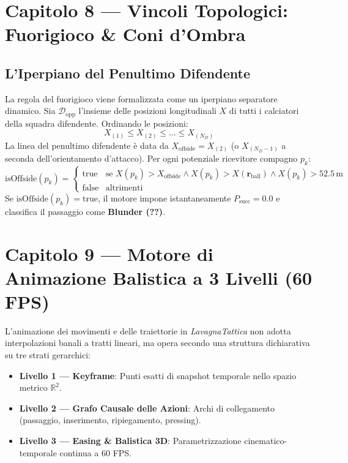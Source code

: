 \documentclass[11pt,a4paper]{article}
\begin{document}
\section{Capitolo 8 — Vincoli Topologici: Fuorigioco \& Coni d'Ombra}

\subsection{L'Iperpiano del Penultimo Difendente}
La regola del fuorigioco viene formalizzata come un iperpiano separatore dinamico. Sia $\mathcal{D}_{\text{opp}}$ l'insieme delle posizioni longitudinali $X$ di tutti i calciatori della squadra difendente. Ordinando le posizioni:
\begin{equation}
X_{(1)} \le X_{(2)} \le \dots \le X_{(N_D)}
\end{equation}
La linea del penultimo difendente è data da $X_{\text{offside}} = X_{(2)}$ (o $X_{(N_D - 1)}$ a seconda dell'orientamento d'attacco).
Per ogni potenziale ricevitore compagno $p_k$:
\begin{equation}
\text{isOffside}(p_k) = \begin{cases}
\text{true} & \text{se } X(p_k) > X_{\text{offside}} \land X(p_k) > X(\mathbf{r}_{\text{ball}}) \land X(p_k) > 52.5\,\text{m} \\
\text{false} & \text{altrimenti}
\end{cases}
\end{equation}
Se $\text{isOffside}(p_k) = \text{true}$, il motore impone istantaneamente $P_{\text{succ}} = 0.0$ e classifica il passaggio come \textbf{Blunder (??)}.


\section{Capitolo 9 — Motore di Animazione Balistica a 3 Livelli (60 FPS)}

L'animazione dei movimenti e delle traiettorie in \textsl{LavagnaTattica} non adotta interpolazioni banali a tratti lineari, ma opera secondo una struttura dichiarativa su tre strati gerarchici:
\begin{itemize}
    \item \textbf{Livello 1 — Keyframe}: Punti esatti di snapshot temporale nello spazio metrico $\mathbb{R}^2$.
    \item \textbf{Livello 2 — Grafo Causale delle Azioni}: Archi di collegamento (passaggio, inserimento, ripiegamento, pressing).
    \item \textbf{Livello 3 — Easing \& Balistica 3D}: Parametrizzazione cinematico-temporale continua a 60 FPS.
\end{itemize}
\end{document}
